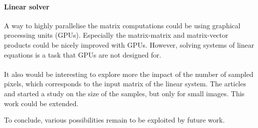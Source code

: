 \paragraph{Linear solver}
A way to highly parallelise the matrix computations could be using graphical processing units (GPUs).
Especially the matrix-matrix and matrix-vector products could be nicely improved with GPUs.
However, solving systems of linear equations is a task that GPUs are not designed for.

\paragraph{}
It also would be interesting to explore more the impact of the number of sampled pixels, which corresponds to the input matrix of the linear system.
The articles \cite{fowlkes_spectral_2004} and \cite{glide_2014} started a study on the size of the samples, but only for small images.
This work could be extended.

To conclude, various possibilities remain to be exploited by future work.
